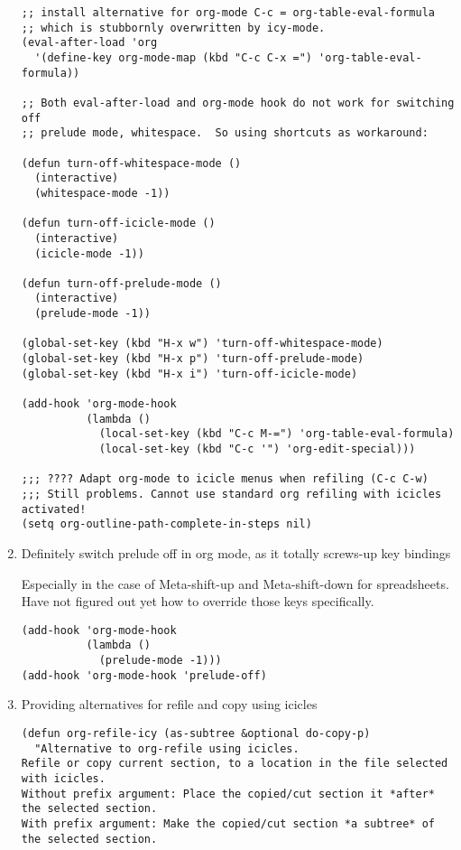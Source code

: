 \documentclass{article}
\begin{document}
\begin{enumerate}
\begin{verbatim}
;; install alternative for org-mode C-c = org-table-eval-formula
;; which is stubbornly overwritten by icy-mode.
(eval-after-load 'org
  '(define-key org-mode-map (kbd "C-c C-x =") 'org-table-eval-formula))

;; Both eval-after-load and org-mode hook do not work for switching off
;; prelude mode, whitespace.  So using shortcuts as workaround:

(defun turn-off-whitespace-mode ()
  (interactive)
  (whitespace-mode -1))

(defun turn-off-icicle-mode ()
  (interactive)
  (icicle-mode -1))

(defun turn-off-prelude-mode ()
  (interactive)
  (prelude-mode -1))

(global-set-key (kbd "H-x w") 'turn-off-whitespace-mode)
(global-set-key (kbd "H-x p") 'turn-off-prelude-mode)
(global-set-key (kbd "H-x i") 'turn-off-icicle-mode)

(add-hook 'org-mode-hook
          (lambda ()
            (local-set-key (kbd "C-c M-=") 'org-table-eval-formula)
            (local-set-key (kbd "C-c '") 'org-edit-special)))

;;; ???? Adapt org-mode to icicle menus when refiling (C-c C-w)
;;; Still problems. Cannot use standard org refiling with icicles activated!
(setq org-outline-path-complete-in-steps nil)
\end{verbatim}

\item Definitely switch prelude off in org mode, as it totally screws-up key bindings
\label{sec-2-5-3-3}

Especially in the case of Meta-shift-up and Meta-shift-down for spreadsheets.
Have not figured out yet how to override those keys specifically.

\begin{verbatim}
(add-hook 'org-mode-hook
          (lambda ()
            (prelude-mode -1)))
(add-hook 'org-mode-hook 'prelude-off)
\end{verbatim}


\item Providing alternatives for refile and copy using icicles
\label{sec-2-5-3-4}

\begin{verbatim}
(defun org-refile-icy (as-subtree &optional do-copy-p)
  "Alternative to org-refile using icicles.
Refile or copy current section, to a location in the file selected with icicles.
Without prefix argument: Place the copied/cut section it *after* the selected section.
With prefix argument: Make the copied/cut section *a subtree* of the selected section.


\end{verbatim}
\end{enumerate}
\end{document}
